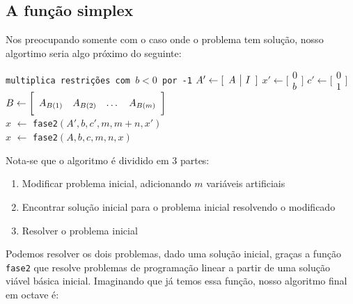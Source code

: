 \documentclass[12pt]{article}
\begin{document}
\subsection{A função simplex}
    Nos preocupando somente com o caso onde o problema tem solução, nosso algortimo seria algo próximo do seguinte: 

    \begin{algorithmic}
        \State \texttt{multiplica restrições com $b < 0$ por -1}
        \State $A' \gets [\begin{array}{c | c} A & I \end{array}]$
        \State $x' \gets \bigg [\begin{array}{c} 0 \\ \hline b \end{array} \bigg]$
        \State $c' \gets \bigg [\begin{array}{c} 0 \\ \hline 1 \end{array} \bigg]$
        \State $B \gets \bigg [\begin{array}{c c c c} A_{B(1)} & A_{B(2)} & \dots & A_{B(m)} \end{array} \bigg ]$ \\
        \State $x$ $\gets$ \texttt{fase2}$(A', b, c', m, m + n, x')$ \\
        \State $x$ $\gets$ \texttt{fase2}$(A, b, c, m, n, x)$ 
    \EndFunction
    \end{algorithmic}

    Nota-se que o algoritmo é dividido em 3 partes:
    \begin{enumerate}
        \item Modificar problema inicial, adicionando $m$ variáveis artificiais
        \item Encontrar solução inicial para o problema inicial resolvendo o modificado
        \item Resolver o problema inicial
    \end{enumerate}
    Podemos resolver os dois problemas, dado uma solução inicial, graças a função \texttt{fase2} que resolve problemas de programação linear a partir de uma solução viável básica inicial. Imaginando que já temos essa função, nosso algoritmo final em octave é:
\end{document}
